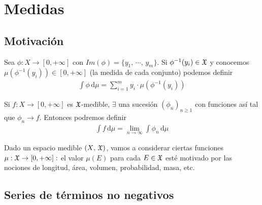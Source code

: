 \section{Medidas}

\subsection{Motivación}
Sea \(\phi: X \to [0, +\infty]\) con \(Im(\phi) = \{ y_1\text{, } \cdots \text{, } y_m \}\). Si \(\phi^{-1}(y_i) \in \mathfrak{X}\) y conocemos
\(\mu(\phi^{-1}(y_i)) \in [0, +\infty]\) (la medida de cada conjunto) podemos definir \begin{align*}
    \int \phi \,\mathrm{d} \mu = \sum_{i=1}^m y_i \cdot \mu(\phi^{-1}(y_i))
\end{align*}

Si \(f: X \to [0, +\infty]\) es \(\mathfrak{X}\)-medible, \(\exists\) una sucesión \((\phi_n)_{n \geq 1}\) con funciones así tal que \(\phi_n \to f\). Entonces podremos definir
\begin{align*}
    \int f \,\mathrm{d}\mu = \lim_{n \to \infty} \int \phi_n \,\mathrm{d}\mu
\end{align*}

Dado un espacio medible \((X\text{, } \mathfrak{X})\), vamos a considerar ciertas funciones \(\mu : \mathfrak{X} \to [0, +\infty] : \) el valor \(\mu(E)\) para cada \(E \in \mathfrak{X}\)
esté motivado por las nociones de longitud, área, volumen, probabilidad, masa, etc.

\clearpage

\subsection{Series de términos no negativos}

